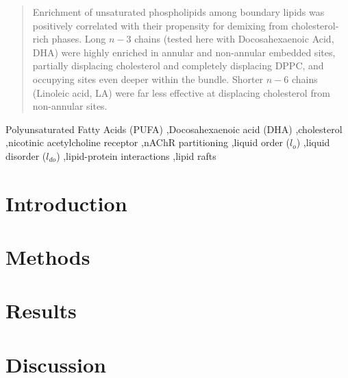 \documentclass[final,3p,times,twocolumn]{elsarticle}
\begin{document}
\begin{frontmatter}
\begin{abstract}
Enrichment of unsaturated phospholipids among boundary lipids was positively correlated with their propensity for demixing from cholesterol-rich phases. Long $n-3$ chains (tested here with Docosahexaenoic Acid, DHA) were highly enriched in annular and non-annular embedded sites, partially displacing cholesterol and completely displacing DPPC, and occupying sites even deeper within the bundle. Shorter $n-6$ chains (Linoleic acid, LA) were far less effective at displacing cholesterol from non-annular sites.   %

\end{abstract}

\begin{keyword}
Polyunsaturated Fatty Acids (PUFA) \sep Docosahexaenoic acid (DHA) \sep cholesterol \sep nicotinic acetylcholine receptor \sep nAChR partitioning \sep liquid order ($l_o$) \sep liquid disorder ($l_{do}$) \sep lipid-protein interactions \sep lipid rafts


\end{keyword}

\end{frontmatter}
\linenumbers
\section{Introduction}
\label{S:1}

\section{Methods}
\label{S:2}

\section{Results}
\label{S:3}

\section{Discussion}
\label{S:4}

\end{document}

